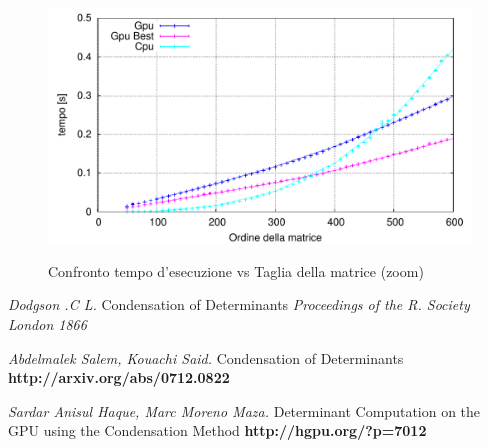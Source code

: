 \documentclass{article}
\begin{document}
\begin{figure}[ht!]
	\centering
	\caption{Confronto tempo d'esecuzione vs Taglia della matrice (zoom)}
	\includegraphics[width=180mm]{TimevsN_Zoom.pdf}
	\label{Zoom}
\end{figure}

\newpage 
\begin{thebibliography}{99}
 \textit{Dodgson .C L.} Condensation of Determinants \textit{Proceedings of the R. Society London 1866 }

 \textit{Abdelmalek Salem, Kouachi Said.} Condensation of Determinants \textbf{http://arxiv.org/abs/0712.0822}

 \textit{Sardar Anisul Haque, Marc Moreno Maza.} Determinant Computation on the GPU using the Condensation Method \textbf{http://hgpu.org/?p=7012}


\end{thebibliography}
\end{document}
